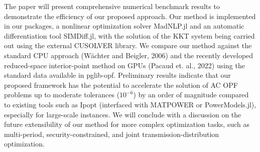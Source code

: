 The paper will present comprehensive numerical benchmark results to demonstrate the efficiency of our proposed approach. Our method is implemented in our packages, a nonlinear optimization solver MadNLP.jl and an automatic differentiation tool SIMDiff.jl, with the solution of the KKT system being carried out using the external CUSOLVER library. We compare our method against the standard CPU approach (W\"{a}chter and Beigler, 2006) and the recently developed reduced-space interior-point method on GPUs (Pacaud et. al., 2022) using the standard data available in pglib-opf. Preliminary results indicate that our proposed framework has the potential to accelerate the solution of AC OPF problems up to moderate tolerances ($10^{-6}$) by an order of magnitude compared to existing tools such as Ipopt (interfaced with MATPOWER or PowerModels.jl), especially for large-scale instances. We will conclude with a discussion on the future extensibility of our method for more complex optimization tasks, such as multi-period, security-constrained, and joint transmission-distribution optimization.


% 
% 




